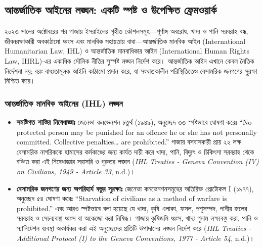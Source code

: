 \subsection{আন্তর্জাতিক আইনের লঙ্ঘন: একটি স্পষ্ট ও উপেক্ষিত
ফ্রেমওয়ার্ক}\label{ux986ux9a8ux9a4ux9b0ux99cux9a4ux995-ux986ux987ux9a8ux9b0-ux9b2ux999ux998ux9a8-ux98fux995ux99f-ux9b8ux9aaux9b7ux99f-ux993-ux989ux9aaux995ux9b7ux9a4-ux9abux9b0ux9aeux993ux9afux9b0ux995}

২০২৩ সালের অক্টোবরের পর গাজায় ইসরাইলের গৃহীত কৌশলসমূহ---পূর্ণাঙ্গ অবরোধ, খাদ্য
ও পানি সরবরাহ বন্ধ, জীবনরক্ষাকারী অবকাঠামো ধ্বংস এবং মানবিক সহায়তায়
বাধা---আন্তর্জাতিক মানবিক আইন (International Humanitarian Law, IHL) ও
আন্তর্জাতিক মানবাধিকার আইন (International Human Rights Law, IHRL)-এর
একাধিক মৌলিক নীতির সুস্পষ্ট লঙ্ঘন নির্দেশ করে। আন্তর্জাতিক আইন এখানে কেবল নৈতিক
নির্দেশনা নয়; বরং বাধ্যতামূলক আইনি কাঠামো প্রদান করে, যা সংঘাতকালীন
পরিস্থিতিতেও বেসামরিক জনগণের সুরক্ষা নিশ্চিত করে।

\subsubsection{আন্তর্জাতিক মানবিক আইনের (IHL)
লঙ্ঘন}\label{ux986ux9a8ux9a4ux9b0ux99cux9a4ux995-ux9aeux9a8ux9acux995-ux986ux987ux9a8ux9b0-ihl-ux9b2ux999ux998ux9a8}

\begin{itemize}
\item
  \textbf{সমষ্টিগত শাস্তির নিষেধাজ্ঞাঃ} জেনেভা কনভেনশন চতুর্থ (১৯৪৯), অনুচ্ছেদ
  ৩৩ স্পষ্টভাবে ঘোষণা করেঃ ``No protected person may be punished for an
  offence he or she has not personally committed. Collective
  penalties\ldots{} are prohibited.'' গাজায় বসবাসকারী প্রায় ২২ লক্ষ
  বেসামরিক নাগরিককে হামাসের কর্মকাণ্ডের জন্য কার্যত দায়ী করে খাদ্য, পানি,
  বিদ্যুৎ ও চিকিৎসা সরবরাহ থেকে বঞ্চিত করা এই নিষেধাজ্ঞার সরাসরি ও গুরুতর লঙ্ঘন
  (\emph{IHL Treaties - Geneva Convention (IV) on Civilians, 1949 -
  Article 33}, n.d.)।
\item
  \textbf{বেসামরিক জনগণের জন্য অপরিহার্য বস্তুর সুরক্ষাঃ} জেনেভা কনভেনশনসমূহের
  অতিরিক্ত প্রোটোকল I (১৯৭৭), অনুচ্ছেদ ৫৪ ঘোষণা করেঃ ``Starvation of
  civilians as a method of warfare is prohibited.'' এবং আরও স্পষ্টভাবে বলা
  হয়েছে যে খাদ্য, কৃষি এলাকা, ফসল, পশুসম্পদ, পানীয় জলের সরবরাহ ও সেচব্যবস্থা
  ধ্বংস বা অকেজো করা নিষিদ্ধ। গাজায় কৃষিজমি ধ্বংস, খাদ্য গুদাম লক্ষ্যবস্তু করা,
  পানি ও স্যানিটেশন ব্যবস্থা অকার্যকর করা এই অনুচ্ছেদের প্রতিটি উপাদানের লঙ্ঘন
  নির্দেশ করে (\emph{IHL Treaties - Additional Protocol (I) to the Geneva
  Conventions, 1977 - Article 54}, n.d.)।
\end{itemize}

